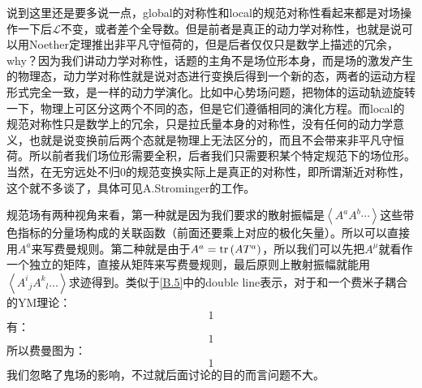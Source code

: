 \begin{remark}
	说到这里还是要多说一点，global的对称性和local的规范对称性看起来都是对场操作一下后$\mathcal{L}$不变，或者差个全导数。但是前者是真正的动力学对称性，也就是说可以用Noether定理推出非平凡守恒荷的，但是后者仅仅只是数学上描述的冗余，why？因为我们讲动力学对称性，话题的主角不是场位形本身，而是场的激发产生的物理态，动力学对称性就是说对态进行变换后得到一个新的态，两者的运动方程形式完全一致，是一样的动力学演化。比如中心势场问题，把物体的运动轨迹旋转一下，物理上可区分这两个不同的态，但是它们遵循相同的演化方程。而local的规范对称性只是数学上的冗余，只是拉氏量本身的对称性，没有任何的动力学意义，也就是说变换前后两个态就是物理上无法区分的，而且不会带来非平凡守恒荷。所以前者我们场位形需要全积，后者我们只需要积某个特定规范下的场位形。当然，在无穷远处不归0的规范变换实际上是真正的对称性，即所谓渐近对称性，这个就不多谈了，具体可见A.Strominger的工作。
\end{remark}

规范场有两种视角来看，第一种就是因为我们要求的散射振幅是$\left<A^aA^b\cdots\right>$这些带色指标的分量场构成的关联函数（前面还要乘上对应的极化矢量）。所以可以直接用$A^a$来写费曼规则。第二种就是由于$A^a=\tr \left(A T^a\right)$，所以我们可以先把$A^\mu$就看作一个独立的矩阵，直接从矩阵来写费曼规则，最后原则上散射振幅就能用$\left<{A^{i}}_j{A^{k}}_l\ldots\right>$求迹得到。类似于\ref{B.5}中的double line表示，对于和一个费米子耦合的YM理论：
\begin{equation}
	1
\end{equation}
有：
\begin{equation}
	1
\end{equation}
所以费曼图为：
\begin{equation}
	1
\end{equation}
我们忽略了鬼场的影响，不过就后面讨论的目的而言问题不大。